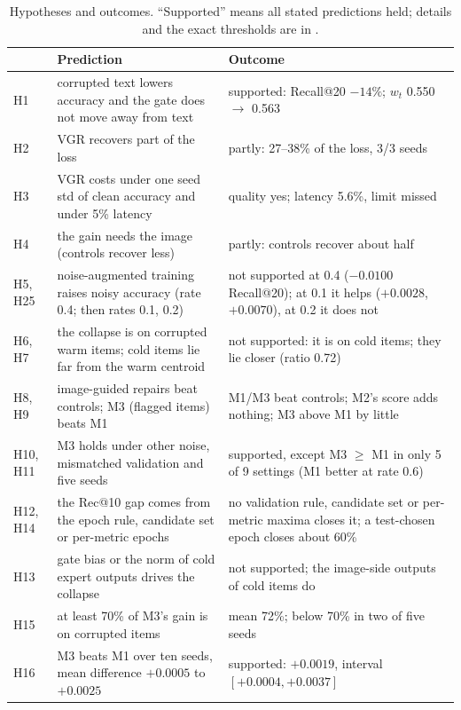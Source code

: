 \documentclass[conference]{IEEEtran}
\newcommand{\code}[1]{\texttt{\detokenize{#1}}}
\begin{document}
\begin{table}[!t]
\centering\footnotesize
\caption{Hypotheses and outcomes. ``Supported'' means all stated predictions held; details and the exact thresholds are in \code{docs/hypotheses.md}.}
\label{tab:hyp}
\renewcommand{\arraystretch}{1.05}
\begin{tabularx}{\textwidth}{@{}l>{\raggedright\arraybackslash}p{6.7cm}>{\raggedright\arraybackslash}X@{}}
\toprule
 & Prediction & Outcome \\
\midrule
H1 & corrupted text lowers accuracy and the gate does not move away from text & supported: Recall@20 $-14\%$; $w_t$ 0.550 $\to$ 0.563 \\
H2 & VGR recovers part of the loss & partly: 27--38\% of the loss, 3/3 seeds \\
H3 & VGR costs under one seed std of clean accuracy and under 5\% latency & quality yes; latency 5.6\%, limit missed \\
H4 & the gain needs the image (controls recover less) & partly: controls recover about half \\
H5, H25 & noise-augmented training raises noisy accuracy (rate 0.4; then rates 0.1, 0.2) & not supported at 0.4 ($-0.0100$ Recall@20); at 0.1 it helps ($+0.0028$, $+0.0070$), at 0.2 it does not \\
H6, H7 & the collapse is on corrupted warm items; cold items lie far from the warm centroid & not supported: it is on cold items; they lie closer (ratio 0.72) \\
H8, H9 & image-guided repairs beat controls; M3 (flagged items) beats M1 & M1/M3 beat controls; M2's score adds nothing; M3 above M1 by little \\
H10, H11 & M3 holds under other noise, mismatched validation and five seeds & supported, except M3 $\ge$ M1 in only 5 of 9 settings (M1 better at rate 0.6) \\
H12, H14 & the Rec@10 gap comes from the epoch rule, candidate set or per-metric epochs & no validation rule, candidate set or per-metric maxima closes it; a test-chosen epoch closes about 60\% \\
H13 & gate bias or the norm of cold expert outputs drives the collapse & not supported; the image-side outputs of cold items do \\
H15 & at least 70\% of M3's gain is on corrupted items & mean 72\%; below 70\% in two of five seeds \\
H16 & M3 beats M1 over ten seeds, mean difference $+0.0005$ to $+0.0025$ & supported: $+0.0019$, interval $[+0.0004,+0.0037]$ \\

\end{tabularx}
\end{table}
\end{document}
